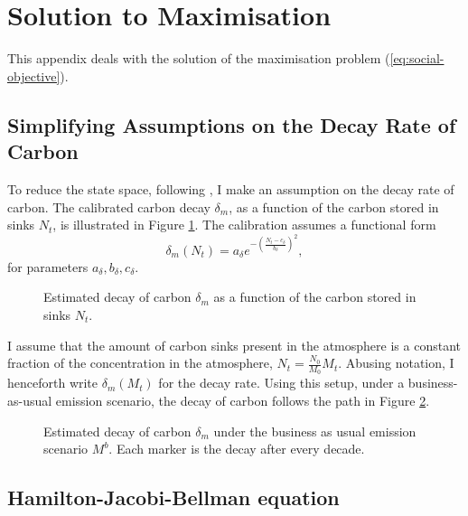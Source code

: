 \documentclass[../../main.tex]{subfiles}
\begin{document}
\section{Solution to Maximisation} \label{appendix:solution}

This appendix deals with the solution of the maximisation problem (\ref{eq:social-objective}).

\subsection{Simplifying Assumptions on the Decay Rate of Carbon} \label{appendix:assumptions}
 
To reduce the state space, following \cite{hambel_optimal_2021}, I make an assumption on the decay rate of carbon. The calibrated carbon decay $\delta_m$, as a function of the carbon stored in sinks $N_t$, is illustrated in Figure \ref{fig:decay}. The calibration assumes a functional form \begin{equation}
    \delta_m(N_t) = a_{\delta} e^{-\left(\frac{N_t - c_{\delta}}{b_{\delta}}\right)^2},
\end{equation} for parameters $a_{\delta}, b_{\delta}, c_{\delta}$.

\begin{figure}[H]
    \centering
    
    \caption{Estimated decay of carbon $\delta_m$ as a  function of the carbon stored in sinks $N_t$.}
    \label{fig:decay}
\end{figure}

I assume that the amount of carbon sinks present in the atmosphere is a constant fraction of the concentration in the atmosphere, $N_t = \frac{N_0}{M_0} M_t$. Abusing notation, I henceforth write $\delta_m(M_t)$ for the decay rate. Using this setup, under a business-as-usual emission scenario, the decay of carbon follows the path in Figure \ref{fig:decaypath}.

\begin{figure}[H]
    \centering
    
    \caption{Estimated decay of carbon $\delta_m$ under the business as usual emission scenario $M^{b}$. Each marker is the decay after every decade.}
    \label{fig:decaypath}
\end{figure}

\subsection{Hamilton-Jacobi-Bellman equation} 
\end{document}
